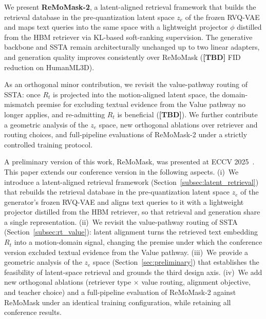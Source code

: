     \item We present \textbf{ReMoMask-2}, a latent-aligned retrieval framework that builds the retrieval database in the pre-quantization latent space $z_e$ of the frozen RVQ-VAE and maps text queries into the same space with a lightweight projector $\phi$ distilled from the HBM retriever via KL-based soft-ranking supervision. The generative backbone and SSTA remain architecturally unchanged up to two linear adapters, and generation quality improves consistently over ReMoMask (\textbf{[TBD]} FID reduction on HumanML3D).

    \item As an orthogonal minor contribution, we revisit the value-pathway routing of SSTA: once $R_t$ is projected into the motion-aligned latent space, the domain-mismatch premise for excluding textual evidence from the Value pathway no longer applies, and re-admitting $R_t$ is beneficial (\textbf{[TBD]}). We further contribute a geometric analysis of the $z_e$ space, new orthogonal ablations over retriever and routing choices, and full-pipeline evaluations of ReMoMask-2 under a strictly controlled training protocol.


A preliminary version of this work, ReMoMask, was presented at ECCV 2025~\cite{remomask}.
This paper extends our conference version in the following aspects. (i)~We introduce a latent-aligned retrieval framework (Section~\ref{subsec:latent_retrieval}) that rebuilds the retrieval database in the pre-quantization latent space $z_e$ of the generator's frozen RVQ-VAE and aligns text queries to it with a lightweight projector distilled from the HBM retriever, so that retrieval and generation share a single representation. (ii)~We revisit the value-pathway routing of SSTA (Section~\ref{subsec:rt_value}): latent alignment turns the retrieved text embedding $R_t$ into a motion-domain signal, changing the premise under which the conference version excluded textual evidence from the Value pathway. (iii)~We provide a geometric analysis of the $z_e$ space (Section~\ref{sec:preliminary}) that establishes the feasibility of latent-space retrieval and grounds the third design axis. (iv)~We add new orthogonal ablations (retriever type $\times$ value routing, alignment objective, and teacher choice) and a full-pipeline evaluation of ReMoMask-2 against ReMoMask under an identical training configuration, while retaining all conference results.


